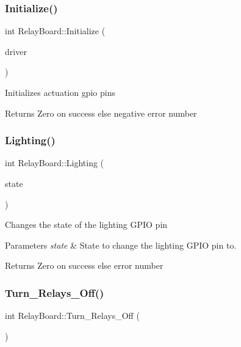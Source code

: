\subsubsection{\texorpdfstring{Initialize()}{Initialize()}}
{\footnotesize\ttfamily int Relay\+Board\+::\+Initialize (\begin{DoxyParamCaption}\item[{\hyperlink{classGPIODriver}{G\+P\+I\+O\+Driver} \&}]{driver }\end{DoxyParamCaption})}

Initializes actuation gpio pins

\begin{DoxyReturn}{Returns}
Zero on success else negative error number 
\end{DoxyReturn}
\mbox{\label{classRelayBoard_a0ce37124540bae0827a1b81e28841f70}} 
\subsubsection{\texorpdfstring{Lighting()}{Lighting()}}
{\footnotesize\ttfamily int Relay\+Board\+::\+Lighting (\begin{DoxyParamCaption}\item[{int}]{state }\end{DoxyParamCaption})}

Changes the state of the lighting G\+P\+IO pin


\begin{DoxyParams}{Parameters}
{\em state} & State to change the lighting G\+P\+IO pin to.\\
\hline
\end{DoxyParams}
\begin{DoxyReturn}{Returns}
Zero on success else error number 
\end{DoxyReturn}
\mbox{\label{classRelayBoard_a2339920ca78f22d9bbab349056ca261a}} 
\subsubsection{\texorpdfstring{Turn\+\_\+\+Relays\+\_\+\+Off()}{Turn\_Relays\_Off()}}
{\footnotesize\ttfamily int Relay\+Board\+::\+Turn\+\_\+\+Relays\+\_\+\+Off (\begin{DoxyParamCaption}{ }\end{DoxyParamCaption})}

